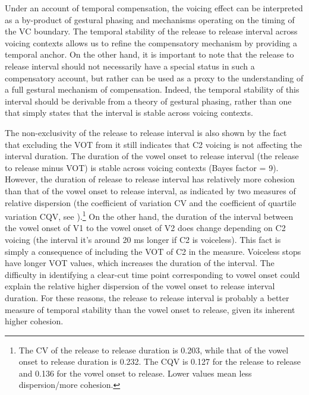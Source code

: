 \documentclass[charis]{glossa}
\begin{document}
Under an account of temporal compensation, the voicing effect can be
interpreted as a by-product of gestural phasing and mechanisms operating
on the timing of the VC boundary. The temporal stability of the release
to release interval across voicing contexts allows us to refine the
compensatory mechanism by providing a temporal anchor. On the other
hand, it is important to note that the release to release interval
should not necessarily have a special status in such a compensatory
account, but rather can be used as a proxy to the understanding of a
full gestural mechanism of compensation. Indeed, the temporal stability
of this interval should be derivable from a theory of gestural phasing,
rather than one that simply states that the interval is stable across
voicing contexts.

The non-exclusivity of the release to release interval is also shown by
the fact that excluding the VOT from it still indicates that C2 voicing
is not affecting the interval duration. The duration of the vowel onset
to release interval (the release to release minus VOT) is stable across
voicing contexts (Bayes factor = 9). However, the duration of release to
release interval has relatively more cohesion than that of the vowel
onset to release interval, as indicated by two measures of relative
dispersion (the coefficient of variation CV and the coefficient of
quartile variation CQV, see
\citealt{bonett2006}).\footnote{The CV of the release to release duration is 0.203, while that of the vowel onset to release duration is 0.232. The CQV is 0.127 for the release to release and 0.136 for the vowel onset to release. Lower values mean less dispersion/more cohesion.}
On the other hand, the duration of the interval between the vowel onset
of V1 to the vowel onset of V2 does change depending on C2 voicing (the
interval it's around 20 ms longer if C2 is voiceless). This fact is
simply a consequence of including the VOT of C2 in the measure.
Voiceless stops have longer VOT values, which increases the duration of
the interval. The difficulty in identifying a clear-cut time point
corresponding to vowel onset could explain the relative higher
dispersion of the vowel onset to release interval duration. For these
reasons, the release to release interval is probably a better measure of
temporal stability than the vowel onset to release, given its inherent
higher cohesion.
\end{document}
